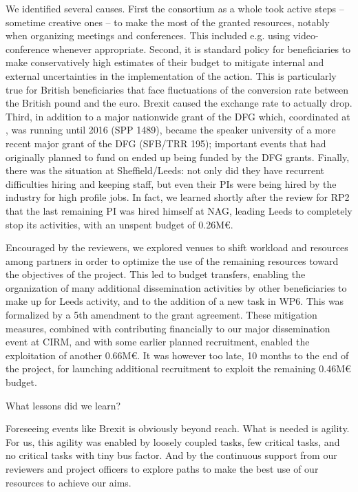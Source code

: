 We identified several causes. First the consortium as a whole took
active steps -- sometime creative ones -- to make the most of the
granted resources, notably when organizing meetings and conferences.
This included e.g. using video-conference whenever appropriate.
Second, it is standard policy for
beneficiaries to make conservatively high estimates of their budget to
mitigate internal and external uncertainties in the implementation of
the action.
This is particularly true for British
beneficiaries that face fluctuations of the conversion rate between the
British pound and the euro. Brexit caused the exchange rate to
actually drop. Third, in addition to a major nationwide grant of the
DFG which, coordinated at , was running until 2016 (SPP
1489),  became the speaker university of a more recent major
grant of the DFG (SFB/TRR 195); important events that  had
originally planned to fund on \ODK ended up being funded by the DFG
grants.
Finally, there was the situation at Sheffield/Leeds: not only did they have
recurrent difficulties hiring and keeping staff, but even their PIs
were being hired by the industry for high profile jobs. In fact, we
learned shortly after the review for RP2 that the last remaining PI
was hired himself at NAG, leading Leeds to completely stop its
activities, with an unspent budget of 0.26M€.

Encouraged by the reviewers, we explored venues to shift workload and
resources among partners in order to optimize the use of the remaining
resources toward the objectives of the project. This led to budget
transfers, enabling the organization of many additional dissemination
activities by other beneficiaries to make up for Leeds activity, and
to the addition of a new task in WP6. This was formalized by a 5th
amendment to the grant agreement. These mitigation measures, combined
with  contributing financially to our major dissemination
event at CIRM, and with some earlier planned recruitment, enabled the
exploitation of another 0.66M€. It was however too late, 10 months to
the end of the project, for launching additional recruitment to
exploit the remaining 0.46M€ budget.

What lessons did we learn?

Foreseeing events like Brexit is obviously beyond reach. What is
needed is agility. For us, this agility was enabled by loosely coupled
tasks, few critical tasks, and no critical tasks with tiny bus factor.
And by the continuous support from our reviewers and project officers
to explore paths to make the best use of our resources to achieve our
aims.

